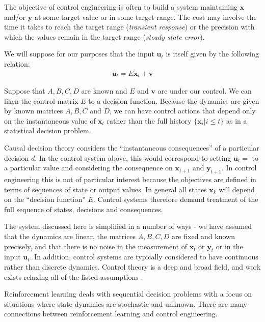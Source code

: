 The objective of control engineering is often to build a system maintaining $\mathbf{x}$ and/or $\mathbf{y}$ at some target value or in some target range. The cost may involve the time it takes to reach the target range (\emph{transient response}) or the precision with which the values remain in the target range (\emph{steady state error}).

We will suppose for our purposes that the input $\mathbf{u}_t$ is itself given by the following relation:
\begin{align}
    \mathbf{u}_t = E\mathbf{x}_t + \mathbf{v}
\end{align}

Suppose that $A, B, C, D$ are known and $E$ and $\mathbf{v}$ are under our control. We can liken the control matrix $E$ to a decision function. Because the dynamics are given by known matrices $A,B,C$ and $D$, we can have control actions that depend only on the instantaneous value of $\mathbf{x}_t$ rather than the full history $\{\mathbf{x}_i|i\leq t\}$ as in a statistical decision problem.

Causal decision theory considers the ``instantaneous consequences'' of a particular decision $d$. In the control system above, this would correspond to setting $\mathbf{u}_t=$ to a particular value and considering the consequence on $\mathbf{x}_{t+1}$ and $\mathbf{y}_{t+1}$. In control engineering this is not of particular interest because the objectives are defined in terms of sequences of state or output values. In general all states $\mathbf{x}_k$ will depend on the ``decision function'' $E$. Control systems therefore demand treatment of the full sequence of states, decisions and consequences.

The system discussed here is simplified in a number of ways - we have assumed that the dynamics are linear, the matrices $A,B,C,D$ are fixed and known precisely, and that there is no noise in the measurement of $\mathbf{x}_t$ or $\mathbf{y}_t$ or in the input $\mathbf{u}_t$. In addition, control systems are typically considered to have continuous rather than discrete dynamics. Control theory is a deep and broad field, and work exists relaxing all of the listed assumptions \cite{stengel_stochastic_1986,kokotovic_foundations_1991}. 


Reinforcement learning deals with sequential decision problems with a focus on situations where state dynamics are stochastic and unknown. There are many connections between reinforcement learning and control engineering.

